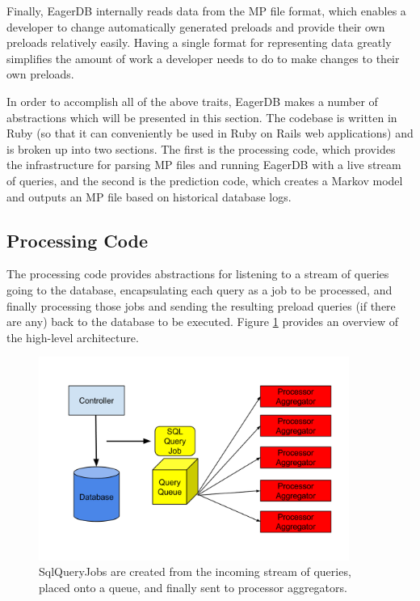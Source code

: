 \documentclass[12pt]{article}
\begin{document}
Finally, EagerDB internally reads data from the MP file format, which enables a developer to change automatically generated preloads and provide their own preloads relatively easily. Having a single format for representing data greatly simplifies the amount of work a developer needs to do to make changes to their own preloads.

In order to accomplish all of the above traits, EagerDB makes a number of abstractions which will be presented in this section. The codebase is written in Ruby (so that it can conveniently be used in Ruby on Rails web applications) and is broken up into two sections. The first is the processing code, which provides the infrastructure for parsing MP files and running EagerDB with a live stream of queries, and the second is the prediction code, which creates a Markov model and outputs an MP file based on historical database logs.

\subsection{Processing Code}

The processing code provides abstractions for listening to a stream of queries going to the database, encapsulating each query as a job to be processed, and finally processing those jobs and sending the resulting preload queries (if there are any) back to the database to be executed. Figure \ref{fig:system-overview} provides an overview of the high-level architecture.

\begin{figure}[h]
  \centering
  \includegraphics[width=4in]{figures/eager_db_overview.png}
  \caption{\label{fig:system-overview}SqlQueryJobs are created from the incoming stream of queries, placed onto a queue, and finally sent to processor aggregators.}
\end{figure}
\end{document}
